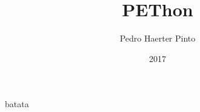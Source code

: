 \documentclass{article}
\title{PEThon}
\author{Pedro Haerter Pinto}
\date{2017}
\begin{document}
\newcommand{\code}[1]{\begin{center} #1 \end{center}}
\newcommand{\si}{\noindent}

\maketitle
\tableofcontents



batata
\end{document}

